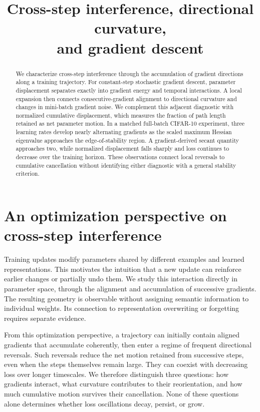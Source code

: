 \documentclass[11pt]{article}
\title{Cross-step interference, directional curvature,\protect\\
and gradient descent}
\author{}
\date{}
\begin{document}
\maketitle
\vspace{-2em}
\begin{abstract}
We characterize cross-step interference through the accumulation of gradient
directions along a training trajectory. For constant-step stochastic gradient
descent, parameter displacement separates exactly into gradient energy and
temporal interactions. A local expansion then connects consecutive-gradient
alignment to directional curvature and changes in mini-batch gradient noise.
We complement this adjacent diagnostic with normalized cumulative displacement,
which measures the fraction of path length retained as net parameter motion.
In a matched full-batch CIFAR-10 experiment, three learning rates develop
nearly alternating gradients as the scaled maximum Hessian eigenvalue approaches
the edge-of-stability region. A gradient-derived secant quantity approaches two,
while normalized displacement falls sharply and loss continues to decrease over
the training horizon. These observations connect local reversals to cumulative
cancellation without identifying either diagnostic with a general stability
criterion.
\end{abstract}

\section{An optimization perspective on cross-step interference}

Training updates modify parameters shared by different examples and learned
representations. This motivates the intuition that a new update can reinforce
earlier changes or partially undo them. We study this interaction directly in
parameter space, through the alignment and accumulation of successive gradients.
The resulting geometry is observable without assigning semantic information to
individual weights. Its connection to representation overwriting or forgetting
requires separate evidence.

From this optimization perspective, a trajectory can initially contain aligned
gradients that accumulate coherently, then enter a regime of frequent directional
reversals. Such reversals reduce the net motion retained from successive steps,
even when the steps themselves remain large. They can coexist with decreasing
loss over longer timescales. We therefore distinguish three questions: how
gradients interact, what curvature contributes to their reorientation, and how
much cumulative motion survives their cancellation. None of these questions
alone determines whether loss oscillations decay, persist, or grow.
\end{document}

